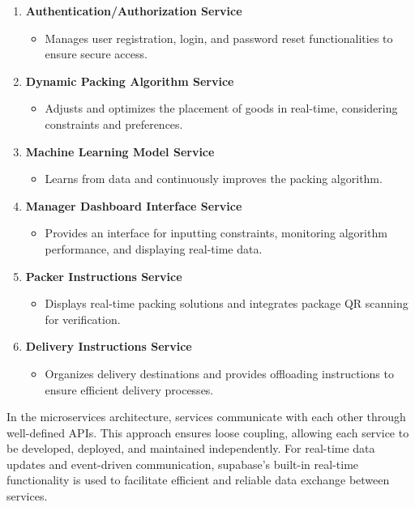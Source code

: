 \documentclass{article}
\begin{document}
\begin{enumerate}
    \item \textbf{Authentication/Authorization Service}
    \begin{itemize}
        \item Manages user registration, login, and password reset functionalities to ensure secure access.
    \end{itemize}
    \item \textbf{Dynamic Packing Algorithm Service}
    \begin{itemize}
        \item Adjusts and optimizes the placement of goods in real-time, considering constraints and preferences.
    \end{itemize}
    \item \textbf{Machine Learning Model Service}
    \begin{itemize}
        \item Learns from data and continuously improves the packing algorithm.
    \end{itemize}
    \item \textbf{Manager Dashboard Interface Service}
    \begin{itemize}
        \item Provides an interface for inputting constraints, monitoring algorithm performance, and displaying real-time data.
    \end{itemize}
    \item \textbf{Packer Instructions Service}
    \begin{itemize}
        \item Displays real-time packing solutions and integrates package QR scanning for verification.
    \end{itemize}
    \item \textbf{Delivery Instructions Service}
    \begin{itemize}
        \item Organizes delivery destinations and provides offloading instructions to ensure efficient delivery processes.
    \end{itemize}
\end{enumerate}

In the microservices architecture, services communicate with each other through
well-defined APIs. This approach ensures loose coupling, allowing each service to be
developed, deployed, and maintained independently. For real-time data updates and
event-driven communication, supabase’s built-in real-time functionality is used to
facilitate efficient and reliable data exchange between services.
\end{document}
